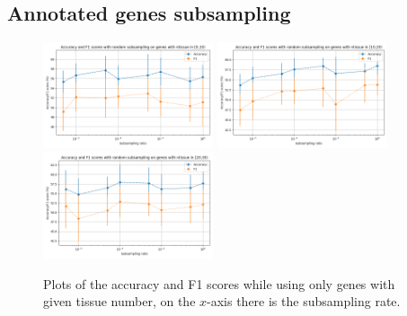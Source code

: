 \subsection{Annotated genes subsampling}
\begin{figure}[ht]
    \begin{center}
\includegraphics[width=5cm]{figures/subsample_ntissue_0.png}
\includegraphics[width=5cm]{figures/subsample_ntissue_10.png}
\includegraphics[width=5cm]{figures/subsample_ntissue_20.png}
    \end{center}
\caption{Plots of the accuracy and F1 scores while using only genes with given tissue number, on the $x$-axis there is the subsampling rate.}
\label{fig:res3}
\end{figure}

